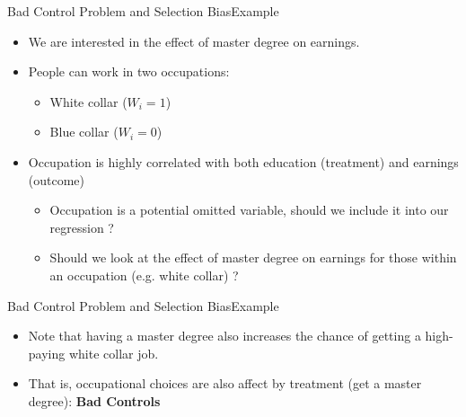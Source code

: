 \documentclass[dvipsnames,hyperref={pdfpagelabels=false}]{beamer}
\begin{document}
\begin{frame}{Bad Control Problem and Selection Bias}{Example}
	\begin{itemize} 
		\item We are interested in the effect of master degree on earnings.
		\vspace{0.2cm}
		\item People can work in two occupations: 
		\begin{itemize} 
			\vspace{0.2cm}
			\item White collar ($W_{i}=1$) 
			\vspace{0.2cm}
			\item Blue collar ($W_{i}=0$)
			\vspace{0.2cm}
		\end{itemize}
		\item Occupation is highly correlated with both education (treatment) and earnings (outcome) 
		\vspace{0.2cm}
		\begin{itemize} 
			\item Occupation is a potential omitted variable, should we include it into our regression ?
			\vspace{0.2cm}
			\item Should we look at the effect of master degree on earnings for those within an occupation (e.g. white collar) ?
		\end{itemize}
	\end{itemize}
\end{frame}


\begin{frame}{Bad Control Problem and Selection Bias}{Example}
	\begin{itemize} 
		\item Note that having a master degree also increases the chance of getting a high-paying white collar job.
		\vspace{0.2cm}
		\item That is, occupational choices are also affect by treatment (get a master degree): \textbf{Bad Controls}
		\vspace{0.2cm}
		
	\end{itemize}
\end{frame}
\end{document}
